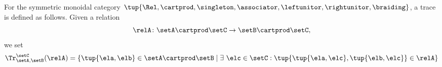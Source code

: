 \begin{ctdefinition}
    For the symmetric monoidal category $\tup{\Rel, \cartprod, \singleton, \associator, \leftunitor, \rightunitor, \braiding}$, a trace is defined as follows.
    Given a relation
    \begin{equation}
        \relA \colon \setA \cartprod \setC \to \setB \cartprod \setC,
    \end{equation}
    we set
    \begin{equation}
        \Tr_{\setA,\setB}^\setC (\relA) = \{ \tup{\ela, \elb} \in \setA \cartprod \setB \mid \exists \ \elc \in \setC : \tup{\tup{\ela, \elc}, \tup{\elb, \elc}} \in \relA \}
    \end{equation}
\end{ctdefinition}



